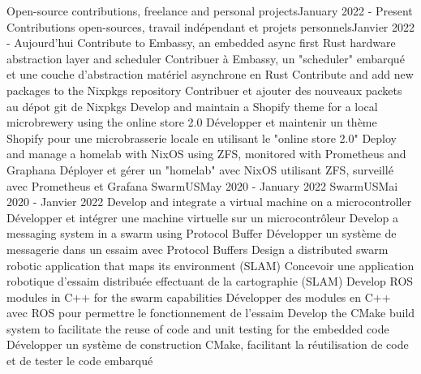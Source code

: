     \resumeSubHeadingListStart
        \resumeProjectHeadingEnFr
              {Open-source contributions, freelance and personal projects}{January 2022 - Present}
              {Contributions open-sources, travail indépendant et projets personnels}{Janvier 2022 - Aujourd’hui}
                \resumeItemListStart
                    \resumeItemEnFr
                        {Contribute to Embassy, an embedded async first Rust hardware abstraction layer and scheduler}
                        {Contribuer à Embassy, un "scheduler" embarqué et une couche d'abstraction matériel asynchrone en Rust}
                    \resumeItemEnFr
                        {Contribute and add new packages to the Nixpkgs repository}
                        {Contribuer et ajouter des nouveaux packets au dépot git de Nixpkgs}
                    \resumeItemEnFr
                        {Develop and maintain a Shopify theme for a local microbrewery using the online store 2.0}
                        {Développer et maintenir un thème Shopify pour une microbrasserie locale en utilisant le "online store 2.0"}
                    \resumeItemEnFr
                        {Deploy and manage a homelab with NixOS using ZFS, monitored with Prometheus and Graphana}
                        {Déployer et gérer un "homelab" avec NixOS utilisant ZFS, surveillé avec Prometheus et Grafana}
                \resumeItemListEnd
      \resumeProjectHeadingEnFr
          {SwarmUS}{May 2020 - January 2022}
          {SwarmUS}{Mai 2020 - Janvier 2022}
            \resumeItemListStart
                \resumeItemEnFr
                    {Develop and integrate a virtual machine on a microcontroller}
                    {Développer et intégrer une machine virtuelle sur un microcontrôleur}
                \resumeItemEnFr
                    {Develop a messaging system in a swarm using Protocol Buffer}
                    {Développer un système de messagerie dans un essaim avec Protocol Buffers}
                \resumeItemEnFr
                    {Design a distributed swarm robotic application that maps its environment (SLAM)}
                    {Concevoir une application robotique d’essaim distribuée effectuant de la cartographie (SLAM)}
                \resumeItemEnFr
                    {Develop ROS modules in C++ for the swarm capabilities}
                    {Développer des modules en C++ avec ROS pour permettre le fonctionnement de l’essaim}
                \resumeItemEnFr
                    {Develop the CMake build system to facilitate the reuse of code and unit testing for the embedded code}
                    {Développer un système de construction CMake, facilitant la réutilisation de code et de tester le code embarqué}
            \resumeItemListEnd
    \resumeSubHeadingListEnd

